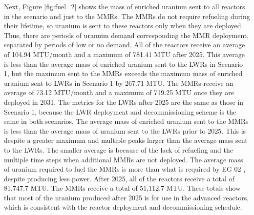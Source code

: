 Next, Figure \ref{fig:fuel_2} shows the mass of enriched uranium sent to all 
reactors in the scenario and just to the \glspl{MMR}. The \glspl{MMR} 
do not require refueling during their lifetime, so uranium is  
sent to these reactors only when they are deployed. Thus, there are periods
of uranuim demand corresponding the \gls{MMR} deployment, separated by periods
of low or no demand. All of the reactors receive an average of 104.94 
MTU/month and a maximum of 781.41 MTU after 2025. 
This average is less than the average mass of enriched uranium 
sent to the \glspl{LWR} in Scenario 1, but the maximum sent to the \glspl{MMR}
exceeds the maximum 
mass of enriched uranium sent to \glspl{LWR} in Scenario 1 by 267.71 MTU.
The \glspl{MMR} receive an average of 73.12 MTU/month and a maximum of 719.25 
MTU once they are deployed in 2031. The metrics for the \glspl{LWR} after 2025
are the same as those in Scenario 1, because the \gls{LWR} deployment and decommissioning 
scheme is the same in both scenarios.  The average 
mass of enriched uranium sent to the 
\glspl{MMR} is less than the average mass of uranium sent to the \glspl{LWR}
prior to 2025. This is despite a greater maximum and multiple peaks larger
than the
average mass sent to the \glspl{LWR}. The smaller average is because of the 
lack of refueling and the multiple time steps when additional 
\glspl{MMR} are not deployed. The average mass of uranium required to fuel 
the \glspl{MMR} is more than what is required by \gls{EG} 02 
\cite{wigeland_nuclear_2014}, despite producing less power. 
After 2025, all of the reactors receive a total of 81,747.7 MTU. The  
\glspl{MMR} receive a total of 51,112.7 MTU. These totals show that most 
of the uranium produced after 2025 is for use in the advanced reactors, 
which is consistent with the reactor deployment and decommissioning schedule. 

